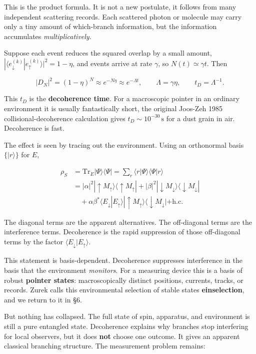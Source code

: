 \documentclass[11pt,a4paper]{article}
\begin{document}
This is the product formula. It is not a new postulate, it follows from many independent scattering records. Each scattered photon or molecule may carry only a tiny amount of which-branch information, but the information accumulates \emph{multiplicatively}.

Suppose each event reduces the squared overlap by a small amount, $|\langle e_\downarrow^{(k)} | e_\uparrow^{(k)}\rangle|^2 = 1 - \eta$, and events arrive at rate $\gamma$, so $N(t) \simeq \gamma t$. Then

\[
|D_N|^2 = (1-\eta)^N \approx e^{-N\eta} \approx e^{-\Lambda t},
\qquad \Lambda = \gamma\eta,
\qquad t_D = \Lambda^{-1}.
\]

This $t_D$ is the \textbf{decoherence time}. For a macroscopic pointer in an ordinary environment it is usually fantastically short, the original Joos-Zeh 1985 collisional-decoherence calculation gives $t_D \sim 10^{-30}\,\mathrm{s}$ for a dust grain in air. Decoherence is fast.

The effect is seen by tracing out the environment. Using an orthonormal basis $\{|r\rangle\}$ for $E$,

\[
\begin{aligned}
\rho_S
&= \mathrm{Tr}_E |\Psi\rangle\langle\Psi| = \sum_r \langle r | \Psi\rangle\langle\Psi | r\rangle \\
&= |\alpha|^2 |\uparrow M_\uparrow\rangle\langle\uparrow M_\uparrow|
+ |\beta|^2 |\downarrow M_\downarrow\rangle\langle\downarrow M_\downarrow| \\
&\quad + \alpha\beta^* \langle E_\downarrow | E_\uparrow\rangle |\uparrow M_\uparrow\rangle\langle\downarrow M_\downarrow| + \text{h.c.}
\end{aligned}
\]

The diagonal terms are the apparent alternatives. The off-diagonal terms are the interference terms. Decoherence is the rapid suppression of those off-diagonal terms by the factor $\langle E_\downarrow | E_\uparrow\rangle$.

This statement is basis-dependent. Decoherence suppresses interference in the basis that the environment \emph{monitors}. For a measuring device this is a basis of robust \textbf{pointer states}: macroscopically distinct positions, currents, tracks, or records. Zurek calls this environmental selection of stable states \textbf{einselection}, and we return to it in §6.

But nothing has collapsed. The full state of spin, apparatus, and environment is still a pure entangled state. Decoherence explains why branches stop interfering for local observers, but it does \textbf{not} choose one outcome. It gives an apparent classical branching structure. The measurement problem remains:
\end{document}
